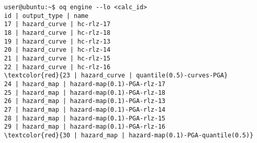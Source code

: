 \begin{Verbatim}[frame=single, commandchars=\\\{\}, fontsize=\small]
user@ubuntu:~$ oq engine --lo <calc_id>
id | output_type | name
17 | hazard_curve | hc-rlz-17
18 | hazard_curve | hc-rlz-18
19 | hazard_curve | hc-rlz-13
20 | hazard_curve | hc-rlz-14
21 | hazard_curve | hc-rlz-15
22 | hazard_curve | hc-rlz-16
\textcolor{red}{23 | hazard_curve | quantile(0.5)-curves-PGA}
24 | hazard_map | hazard-map(0.1)-PGA-rlz-17
25 | hazard_map | hazard-map(0.1)-PGA-rlz-18
26 | hazard_map | hazard-map(0.1)-PGA-rlz-13
27 | hazard_map | hazard-map(0.1)-PGA-rlz-14
28 | hazard_map | hazard-map(0.1)-PGA-rlz-15
29 | hazard_map | hazard-map(0.1)-PGA-rlz-16
\textcolor{red}{30 | hazard_map | hazard-map(0.1)-PGA-quantile(0.5)}
\end{Verbatim}